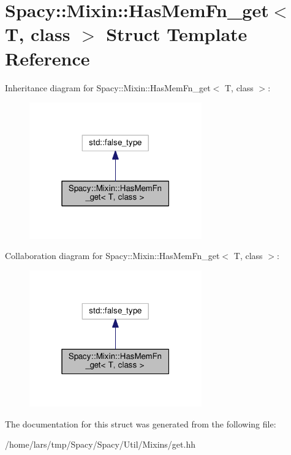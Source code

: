 \hypertarget{structSpacy_1_1Mixin_1_1HasMemFn__get}{}\section{Spacy\+:\+:Mixin\+:\+:Has\+Mem\+Fn\+\_\+get$<$ T, class $>$ Struct Template Reference}
\label{structSpacy_1_1Mixin_1_1HasMemFn__get}


Inheritance diagram for Spacy\+:\+:Mixin\+:\+:Has\+Mem\+Fn\+\_\+get$<$ T, class $>$\+:
\nopagebreak
\begin{figure}[H]
\begin{center}
\leavevmode
\includegraphics[width=211pt]{structSpacy_1_1Mixin_1_1HasMemFn__get__inherit__graph}
\end{center}
\end{figure}


Collaboration diagram for Spacy\+:\+:Mixin\+:\+:Has\+Mem\+Fn\+\_\+get$<$ T, class $>$\+:
\nopagebreak
\begin{figure}[H]
\begin{center}
\leavevmode
\includegraphics[width=211pt]{structSpacy_1_1Mixin_1_1HasMemFn__get__coll__graph}
\end{center}
\end{figure}


The documentation for this struct was generated from the following file\+:\begin{DoxyCompactItemize}
\item 
/home/lars/tmp/\+Spacy/\+Spacy/\+Util/\+Mixins/get.\+hh\end{DoxyCompactItemize}

